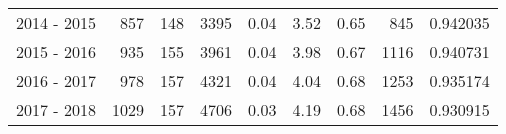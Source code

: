 \begin{tabular}{lrrrrrrrl}
2014 - 2015 &                     857 &         148 &     3395 &        0.04 &        3.52 &        0.65 &         845 &   0.942035 \\
2015 - 2016 &                     935 &         155 &     3961 &        0.04 &        3.98 &        0.67 &        1116 &   0.940731 \\
2016 - 2017 &                     978 &         157 &     4321 &        0.04 &        4.04 &        0.68 &        1253 &   0.935174 \\
2017 - 2018 &                    1029 &         157 &     4706 &        0.03 &        4.19 &        0.68 &        1456 &   0.930915 \\
\bottomrule
\end{tabular}
